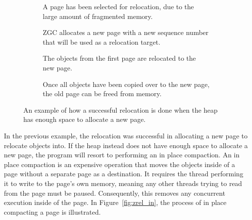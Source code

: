 \begin{figure}[H]
    \centering
    \begin{subfigure}[t]{.2\textwidth}
        \centering
        
        \caption{A page has been selected for relocation, due to the large amount of fragmented memory.}
        \label{fig:zrel_new1}
    \end{subfigure}%
    \hfill\vline\hfill
    \begin{subfigure}[t]{.2\textwidth}
        \centering
        
        \caption{ZGC allocates a new page with a new sequence number that will be used as a relocation target.}
        \label{fig:zrel_new2}
    \end{subfigure}%
    \hfill\vline\hfill
    \begin{subfigure}[t]{.2\textwidth}
        \centering
        
        \caption{The objects from the first page are relocated to the new page.}
        \label{fig:zrel_new3}
    \end{subfigure}%
    \hfill\vline\hfill
    \begin{subfigure}[t]{.2\textwidth}
        \centering
        
        \caption{Once all objects have been copied over to the new page, the old page can be freed from memory.}
        \label{fig:zrel_new3}
    \end{subfigure}%
    \caption{An example of how a successful relocation is done when the heap has enough space to allocate a new page.}
    \label{fig:zrel_new}
\end{figure}

In the previous example, the relocation was successful in allocating a new page to relocate objects into. If the heap instead does not have enough space to allocate a new page, the program will resort to performing an in place compaction. An in place compaction is an expensive operation that moves the objects inside of a page without a separate page as a destination. It requires the thread performing it to write to the page's own memory, meaning any other threads trying to read from the page must be paused. Consequently, this removes any concurrent execution inside of the page. In Figure~\ref{fig:zrel_in}, the process of in place compacting a page is illustrated. 


